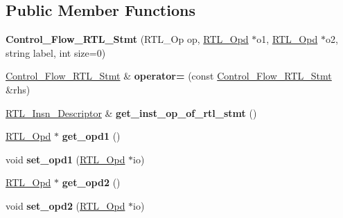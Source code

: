 \subsection*{Public Member Functions}
\begin{DoxyCompactItemize}
\item 
\mbox{\label{classControl__Flow__RTL__Stmt_a8dbd351c9608f6e0ce5f1483dface410}} 
{\bfseries Control\+\_\+\+Flow\+\_\+\+R\+T\+L\+\_\+\+Stmt} (R\+T\+L\+\_\+\+Op op, \hyperlink{classRTL__Opd}{R\+T\+L\+\_\+\+Opd} $\ast$o1, \hyperlink{classRTL__Opd}{R\+T\+L\+\_\+\+Opd} $\ast$o2, string label, int size=0)
\item 
\mbox{\label{classControl__Flow__RTL__Stmt_a3b70665d57786a51f55cc2c8ea7a7212}} 
\hyperlink{classControl__Flow__RTL__Stmt}{Control\+\_\+\+Flow\+\_\+\+R\+T\+L\+\_\+\+Stmt} \& {\bfseries operator=} (const \hyperlink{classControl__Flow__RTL__Stmt}{Control\+\_\+\+Flow\+\_\+\+R\+T\+L\+\_\+\+Stmt} \&rhs)
\item 
\mbox{\label{classControl__Flow__RTL__Stmt_a53c419f41cf26da959bc7ed0829e1c66}} 
\hyperlink{classRTL__Insn__Descriptor}{R\+T\+L\+\_\+\+Insn\+\_\+\+Descriptor} \& {\bfseries get\+\_\+inst\+\_\+op\+\_\+of\+\_\+rtl\+\_\+stmt} ()
\item 
\mbox{\label{classControl__Flow__RTL__Stmt_add3d591875dc85596089706b1238e3e8}} 
\hyperlink{classRTL__Opd}{R\+T\+L\+\_\+\+Opd} $\ast$ {\bfseries get\+\_\+opd1} ()
\item 
\mbox{\label{classControl__Flow__RTL__Stmt_af8a5dffc7e6b6046c85e0b98a009912f}} 
void {\bfseries set\+\_\+opd1} (\hyperlink{classRTL__Opd}{R\+T\+L\+\_\+\+Opd} $\ast$io)
\item 
\mbox{\label{classControl__Flow__RTL__Stmt_a190db8d9cf682fd37c8cbbc98b25ad47}} 
\hyperlink{classRTL__Opd}{R\+T\+L\+\_\+\+Opd} $\ast$ {\bfseries get\+\_\+opd2} ()
\item 
\mbox{\label{classControl__Flow__RTL__Stmt_ac56daf2360807d006082ae052d3bf9c7}} 
void {\bfseries set\+\_\+opd2} (\hyperlink{classRTL__Opd}{R\+T\+L\+\_\+\+Opd} $\ast$io)

\end{DoxyCompactItemize}
